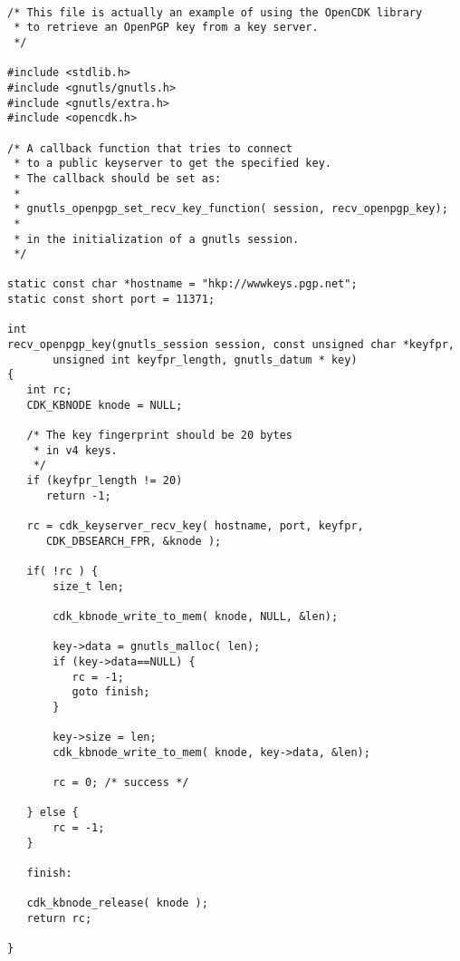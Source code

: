 \begin {verbatim}

/* This file is actually an example of using the OpenCDK library
 * to retrieve an OpenPGP key from a key server.
 */

#include <stdlib.h>
#include <gnutls/gnutls.h>
#include <gnutls/extra.h>
#include <opencdk.h>

/* A callback function that tries to connect
 * to a public keyserver to get the specified key.
 * The callback should be set as:
 *
 * gnutls_openpgp_set_recv_key_function( session, recv_openpgp_key);
 *
 * in the initialization of a gnutls session.
 */

static const char *hostname = "hkp://wwwkeys.pgp.net";
static const short port = 11371;

int
recv_openpgp_key(gnutls_session session, const unsigned char *keyfpr, 
       unsigned int keyfpr_length, gnutls_datum * key)
{
   int rc;
   CDK_KBNODE knode = NULL;

   /* The key fingerprint should be 20 bytes
    * in v4 keys.
    */
   if (keyfpr_length != 20)
      return -1;

   rc = cdk_keyserver_recv_key( hostname, port, keyfpr, 
      CDK_DBSEARCH_FPR, &knode );

   if( !rc ) {
       size_t len;

       cdk_kbnode_write_to_mem( knode, NULL, &len);

       key->data = gnutls_malloc( len);
       if (key->data==NULL) {
          rc = -1;
          goto finish;
       }

       key->size = len;
       cdk_kbnode_write_to_mem( knode, key->data, &len);

       rc = 0; /* success */

   } else {
       rc = -1;
   }

   finish:

   cdk_kbnode_release( knode );
   return rc;

}


\end{verbatim}

